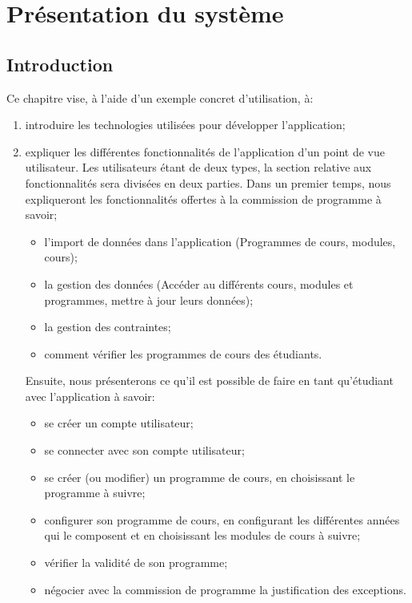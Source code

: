 \chapter{Présentation du système}
\label{presentation_systeme}
\section{Introduction}

Ce chapitre vise, à l'aide d'un exemple concret d'utilisation,  à:
\begin{enumerate}
\item introduire les technologies utilisées pour développer l'application;
\item expliquer les différentes fonctionnalités de l'application d'un point de vue utilisateur. Les utilisateurs étant de deux types, la section relative aux fonctionnalités sera divisées en deux parties. Dans un premier temps, nous expliqueront les fonctionnalités offertes à la commission de programme à savoir;
  \begin{itemize}
    \item l'import de données dans l'application (Programmes de cours, modules, cours);
    \item la gestion des données (Accéder au différents cours, modules et programmes, mettre à jour leurs données);
    \item la gestion des contraintes;
    \item comment vérifier les programmes de cours des étudiants.
  \end{itemize}
Ensuite, nous présenterons ce qu'il est possible de faire en tant qu'étudiant avec l'application à savoir:
\begin{itemize}
  \item se créer un compte utilisateur;
  \item se connecter avec son compte utilisateur;
  \item se créer (ou modifier) un programme de cours, en choisissant le programme à suivre;
  \item configurer son programme de cours, en configurant les différentes années qui le composent et en choisissant les modules de cours à suivre;
  \item vérifier la validité de son programme;
  \item négocier avec la commission de programme la justification des exceptions. 
\end{itemize}
 
\end{enumerate}

